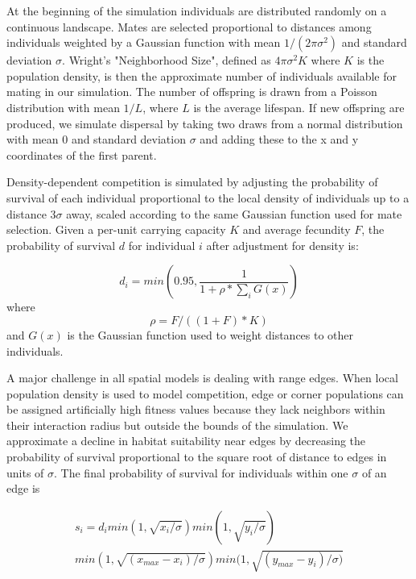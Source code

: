 \documentclass[9pt,twocolumn,twoside,lineno]{gsajnl}
\begin{document}
At the beginning of the simulation individuals are distributed randomly on a continuous landscape. Mates are selected proportional to distances among individuals weighted by a Gaussian function with mean $1/(2\pi\sigma^2)$ and standard deviation $\sigma$. Wright's \cite{Wright1943} "Neighborhood Size", defined as $4\pi\sigma^2 K$ where $K$ is the population density, is then the approximate number of individuals available for mating in our simulation. The number of offspring is drawn from a Poisson distribution with mean $1/L$, where $L$ is the average lifespan. If new offspring are produced, we simulate dispersal by taking two draws from a normal distribution with mean 0 and standard deviation $\sigma$ and adding these to the x and y coordinates of the first parent. 

Density-dependent competition is simulated by adjusting the probability of survival of each individual proportional to the local density of individuals up to a distance $3\sigma$ away, scaled according to the same Gaussian function used for mate selection. Given a per-unit carrying capacity $K$ and average fecundity $F$, the probability of survival $d$ for individual $i$ after adjustment for density is:

\begin{equation}
    d_{i}=min(0.95,\frac{1}{1+\rho*\sum_{i}{G(x)}})
\end{equation}
where 
\begin{equation}
    \rho = F/((1+F)*K)
\end{equation} 
and $G(x)$ is the Gaussian function used to weight distances to other individuals. 

A major challenge in all spatial models is dealing with range edges. When local population density is used to model competition, edge or corner populations can be assigned artificially high fitness values because they lack neighbors within their interaction radius but outside the bounds of the simulation. We approximate a decline in habitat suitability near edges by decreasing the probability of survival proportional to the square root of distance to edges in units of $\sigma$. The final probability of survival for individuals within one $\sigma$ of an edge is 

\begin{multline}
    s_{i}=d_{i} min(1,\sqrt{x_{i}/\sigma})
    min(1,\sqrt{y_{i}/\sigma})\\
    min(1,\sqrt{(x_{max}-x_{i})/\sigma})
    min(1,\sqrt{(y_{max}-y_{i})/\sigma)}
\end{multline}
\end{document}
